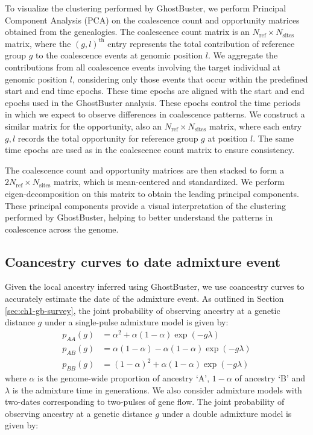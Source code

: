 To visualize the clustering performed by GhostBuster, we perform Principal Component Analysis (PCA) on the coalescence count and opportunity matrices obtained from the genealogies. The coalescence count matrix is an $N_{\text{ref}} \times N_{\text{sites}}$ matrix, where the $(g, l)^{\text{th}}$ entry represents the total contribution of reference group $g$ to the coalescence events at genomic position $l$. We aggregate the contributions from all coalescence events involving the target individual at genomic position \( l \), considering only those events that occur within the predefined start and end time epochs. These time epochs are aligned with the start and end epochs used in the GhostBuster analysis. These epochs control the time periods in which we expect to observe differences in coalescence patterns. We construct a similar matrix for the opportunity, also an $N_{\text{ref}} \times N_{\text{sites}}$ matrix, where each entry $g,l$ records the total opportunity for reference group $g$ at position $l$. The same time epochs are used as in the coalescence count matrix to ensure consistency.

The coalescence count and opportunity matrices are then stacked to form a $2N_{\text{ref}} \times N_{\text{sites}}$ matrix, which is mean-centered and standardized. We perform eigen-decomposition on this matrix to obtain the leading principal components. These principal components provide a visual interpretation of the clustering performed by GhostBuster, helping to better understand the patterns in coalescence across the genome.

\subsection{Coancestry curves to date admixture event}
\label{sec:ch2-gb-coancestry}

Given the local ancestry inferred using GhostBuster, we use coancestry curves to accurately estimate the date of the admixture event.
%
As outlined in Section \ref{sec:ch1-gb-survey}, the joint probability of observing ancestry at a genetic distance \( g \) under a single-pulse admixture model is given by:
\begin{align}
    p_{AA}(g) &= \alpha^2 + \alpha (1 - \alpha) \exp(-g \lambda) \nonumber \\
    p_{AB}(g) &= \alpha (1 - \alpha) - \alpha (1 - \alpha) \exp(-g \lambda) \nonumber \\
    p_{BB}(g) &= (1-\alpha)^2 + \alpha (1 - \alpha) \exp(-g \lambda)
\end{align}
where $\alpha$ is the genome-wide proportion of ancestry `A', $1-\alpha$ of ancestry `B' and $\lambda$ is the admixture time in generations. We also consider admixture models with two-dates corresponding to two-pulses of gene flow. The joint probability of observing ancestry at a genetic distance \( g \) under a double admixture model is given by:

